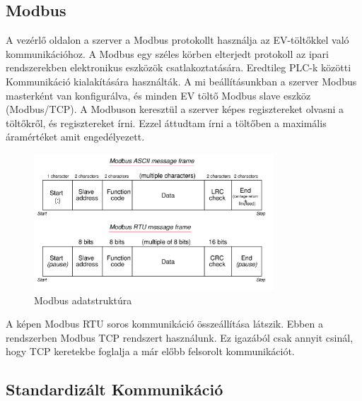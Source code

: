 \subsection{Modbus}

A vezérlő oldalon a szerver a Modbus protokollt használja az EV-töltőkkel való kommunikációhoz. 
A Modbus egy széles körben elterjedt protokoll az ipari rendszerekben elektronikus eszközök csatlakoztatására. 
Eredtileg PLC-k közötti Kommunikáció kialakítására használták.
A mi beállításunkban a szerver Modbus masterként van konfigurálva, 
és minden EV töltő Modbus slave eszköz (Modbus/TCP). A Modbuson keresztül a szerver képes regisztereket olvasni a 
töltőkről, és regisztereket írni. Ezzel áttudtam írni a töltőben a maximális áramértéket amit engedélyezett. 
\cite{mcuoneclipse:evcharger}

\begin{figure}[!ht]
    \centering
    \includegraphics[width=0.8\textwidth, keepaspectratio]{figures/Modbus_Frame.png}
    \caption{Modbus adatstruktúra \cite{instrumentationtools:modbus}} 
\end{figure}

A képen Modbus RTU soros kommunikáció összeállítása látszik. Ebben a rendszerben Modbus TCP rendszert használunk.
Ez igazából csak annyit csinál, hogy TCP keretekbe foglalja a már előbb felsorolt kommunikációt.

\subsection{Standardizált Kommunikáció}
